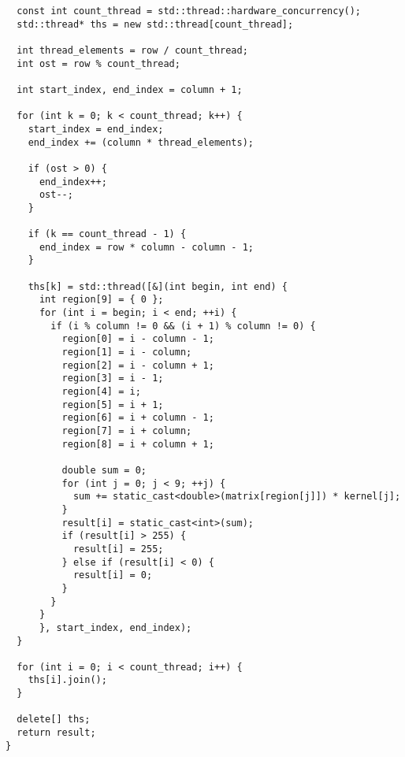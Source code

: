 \documentclass{report}
\begin{document}
\begin{lstlisting}
  const int count_thread = std::thread::hardware_concurrency();
  std::thread* ths = new std::thread[count_thread];

  int thread_elements = row / count_thread;
  int ost = row % count_thread;

  int start_index, end_index = column + 1;

  for (int k = 0; k < count_thread; k++) {
    start_index = end_index;
    end_index += (column * thread_elements);

    if (ost > 0) {
      end_index++;
      ost--;
    }

    if (k == count_thread - 1) {
      end_index = row * column - column - 1;
    }

    ths[k] = std::thread([&](int begin, int end) {
      int region[9] = { 0 };
      for (int i = begin; i < end; ++i) {
        if (i % column != 0 && (i + 1) % column != 0) {
          region[0] = i - column - 1;
          region[1] = i - column;
          region[2] = i - column + 1;
          region[3] = i - 1;
          region[4] = i;
          region[5] = i + 1;
          region[6] = i + column - 1;
          region[7] = i + column;
          region[8] = i + column + 1;

          double sum = 0;
          for (int j = 0; j < 9; ++j) {
            sum += static_cast<double>(matrix[region[j]]) * kernel[j];
          }
          result[i] = static_cast<int>(sum);
          if (result[i] > 255) {
            result[i] = 255;
          } else if (result[i] < 0) {
            result[i] = 0;
          }
        }
      }
      }, start_index, end_index);
  }

  for (int i = 0; i < count_thread; i++) {
    ths[i].join();
  }

  delete[] ths;
  return result;
}

\end{lstlisting}
\end{document}
